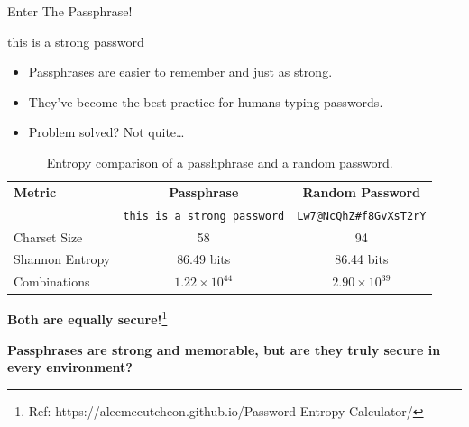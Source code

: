 \documentclass[aspectratio=169]{beamer}
\begin{document}
\begin{frame}{Enter The Passphrase!}
  \begin{center}
    {\Large \ttfamily this is a strong password}
  \end{center}
  \begin{itemize}
    \item Passphrases are easier to remember and just as strong.
    \item They've become the best practice for humans typing passwords.
    \item Problem solved? Not quite\ldots
  \end{itemize}
  
  \vspace{0.5cm}
  
  \begin{table}[h]
    \centering
    \begin{tabular}{|l|c|c|}
      \hline
      \textbf{Metric} & \textbf{Passphrase} & \textbf{Random Password} \\
      & \texttt{this is a strong password} & \texttt{Lw7@NcQhZ\#f8GvXsT2rY} \\
      \hline
      Charset Size & 58 & 94 \\
      \hline
      Shannon Entropy & 86.49 bits & 86.44 bits \\
      \hline
      Combinations & $1.22 \times 10^{44}$ & $2.90 \times 10^{39}$ \\
      \hline
    \end{tabular}
    \caption{Entropy comparison of a passhphrase and a random password.}
  \end{table}
  
  \centering
  \textbf{Both are equally secure!}\footnote{\tiny Ref: https://alecmccutcheon.github.io/Password-Entropy-Calculator/}
  \vspace{2mm}
\end{frame}
\begin{frame}
    \vfill
    \centering
    {\bfseries \large Passphrases are strong and memorable, but are they truly secure in every environment?}
    \vfill
\end{frame}
\end{document}
